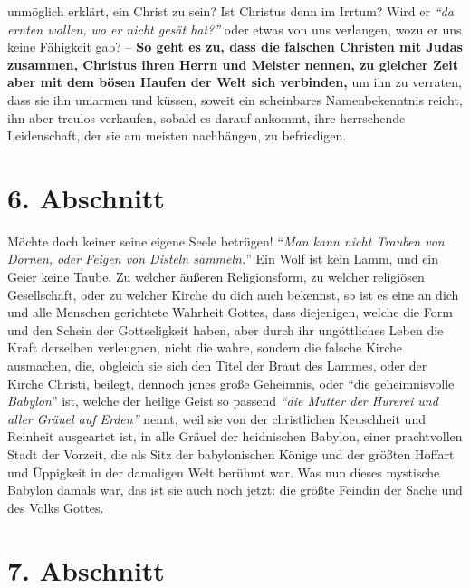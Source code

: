 unmöglich erklärt, ein Christ zu sein? Ist Christus denn im Irrtum? Wird er
\textit{"`da ernten wollen, wo er nicht gesät hat?"'}
oder etwas von uns verlangen, wozu er uns
keine Fähigkeit gab?
 \label{ref:01_05_in_suende_verbinden}
-- \textbf{So geht es zu, dass die falschen Christen mit Judas zusammen, Christus ihren
Herrn und Meister nennen, zu gleicher Zeit aber mit dem bösen Haufen der Welt
sich verbinden,} um ihn zu verraten,
dass sie ihn umarmen und küssen, soweit ein scheinbares Namenbekenntnis
 reicht, ihn aber treulos verkaufen, sobald es darauf
ankommt, ihre herrschende Leidenschaft, der sie am meisten nachhängen, zu
befriedigen.

\section{6. Abschnitt} \label{kap1_ab6}

Möchte doch keiner seine eigene Seele betrügen!
"`\textit{Man kann nicht Trauben von Dornen, oder Feigen von Disteln sammeln.}"'
Ein Wolf ist kein Lamm, und ein Geier keine Taube.
Zu welcher äußeren Religionsform, zu welcher religiösen Gesellschaft, oder zu
welcher Kirche du dich auch bekennst, so ist es eine an dich und alle Menschen
gerichtete Wahrheit Gottes, dass diejenigen, welche die Form und den Schein der
Gottseligkeit haben, aber durch ihr ungöttliches Leben die Kraft derselben
verleugnen, nicht die wahre, sondern die falsche Kirche ausmachen, die, obgleich
sie sich den Titel der Braut des Lammes, oder der Kirche Christi, beilegt,
dennoch jenes große Geheimnis, oder "`die geheimnisvolle \textit{Babylon}"'
  ist, welche der heilige
Geist so passend
\textit{"`die Mutter der Hurerei und aller Gräuel auf Erden"'}
nennt, weil
sie von der christlichen Keuschheit und Reinheit ausgeartet ist, in alle Gräuel
der heidnischen Babylon, einer prachtvollen Stadt der Vorzeit, die als Sitz der
babylonischen Könige und der größten Hoffart und Üppigkeit in der damaligen
Welt berühmt war. Was nun dieses mystische Babylon damals war, das ist sie auch
noch jetzt: die größte Feindin der Sache und des Volks Gottes.

\section{7. Abschnitt} \label{kap1_ab7}

